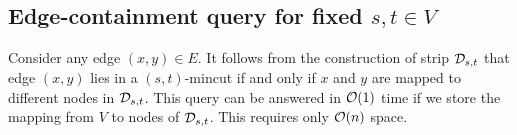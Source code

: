 \subsection{Edge-containment query for fixed \texorpdfstring{$s,t \in V$}{s,t in V}} \label{subsec:fixed-s-t}





Consider  any edge $(x,y)\in E$. It follows from the construction of strip  ${\cal D}_{s,t}$ that edge $(x,y)$ lies in a $(s,t)$-mincut if and only if $x$ and $y$ are mapped to different nodes in ${\cal D}_{s,t}$. This query can be answered in ${\cal O}(1)$ time if we store the mapping from $V$ to nodes of ${\cal D}_{s,t}$. This requires only ${\cal O}(n)$ space.

